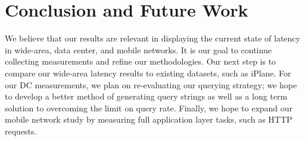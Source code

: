
\section{Conclusion and Future Work}
\label{sec:conclusion}

We believe that our results are relevant in displaying the current state of latency in wide-area, data center, and mobile networks. It is our goal to continue collecting measurements and refine our methodologies. Our next step is to compare our wide-area latency results to existing datasets, such as iPlane. For our DC measurements, we plan on re-evaluating our querying strategy; we hope to develop a better method of generating query strings as well as a long term solution to overcoming the limit on query rate. Finally, we hope to expand our mobile network study by measuring full application layer tasks, such as HTTP requests.

